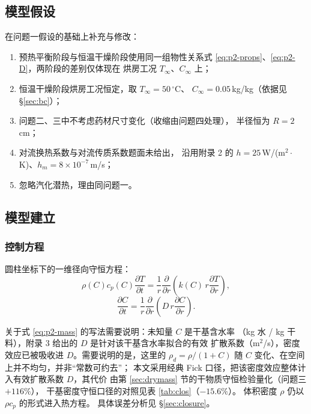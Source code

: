 \documentclass[12pt,a4paper,fontset=none]{ctexart}
\begin{document}
\subsection{模型假设}

在问题一假设的基础上补充与修改：

\begin{enumerate}
  \item[(B1)] 预热平衡阶段与恒温干燥阶段使用同一组物性关系式
        \eqref{eq:p2-props}、\eqref{eq:p2-D}，两阶段的差别仅体现在
        烘房工况 $T_\infty$、$C_\infty$ 上；
  \item[(B2)] 恒温干燥阶段烘房工况恒定，取 $T_\infty=50\,^\circ$C、
        $C_\infty=0.05$\,kg/kg（依据见 §\ref{sec:bc}）；
  \item[(B3)] 问题二、三中不考虑药材尺寸变化（收缩由问题四处理），
        半径恒为 $R=2$\,cm；
  \item[(B4)] 对流换热系数与对流传质系数题面未给出，
        沿用附录 2 的 $h=25$\,W/(m$^2\cdot$K)、$h_m=8\times10^{-7}$\,m/s；
  \item[(B5)] 忽略汽化潜热，理由同问题一。
\end{enumerate}

\subsection{模型建立}

\subsubsection{控制方程}

圆柱坐标下的一维径向守恒方程：
\begin{equation}
  \rho(C)c_p(C)\frac{\partial T}{\partial t}
  =\frac{1}{r}\frac{\partial}{\partial r}
   \left(k(C)\,r\frac{\partial T}{\partial r}\right),
  \label{eq:p2-heat}
\end{equation}
\begin{equation}
  \frac{\partial C}{\partial t}
  =\frac{1}{r}\frac{\partial}{\partial r}
   \left(D\,r\frac{\partial C}{\partial r}\right).
  \label{eq:p2-mass}
\end{equation}

关于式 \eqref{eq:p2-mass} 的写法需要说明：未知量 $C$ 是干基含水率
（kg 水 / kg 干料），附录 3 给出的 $D$ 是针对该干基含水率拟合的有效
扩散系数（m$^2$/s），密度效应已被吸收进 $D$。需要说明的是，这里的
$\rho_d=\rho/(1+C)$ 随 $C$ 变化、在空间上并不均匀，并非“常数可约去”；
本文采用经典 Fick 口径，把该密度效应整体计入有效扩散系数 $D$，其代价
由第 \ref{sec:drymass} 节的干物质守恒检验量化（问题三 $+116\%$），
干基密度守恒口径的对照见表 \ref{tab:clos}（$-15.6\%$）。
体积密度 $\rho$ 仍以 $\rho c_p$ 的形式进入热方程。
具体误差分析见 §\ref{sec:closure}。
\end{document}
